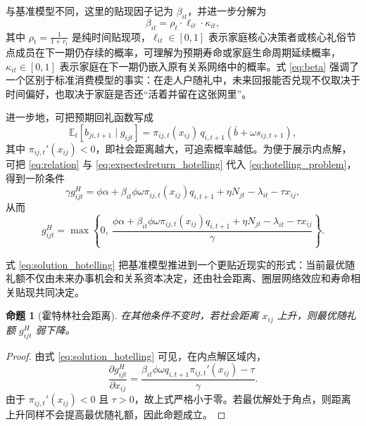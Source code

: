 \documentclass[12pt,a4paper]{ctexart}
\newtheorem{proposition}{命题}
\newcommand{\E}{\mathbb{E}}
\begin{document}
与基准模型不同，这里的贴现因子记为 $\beta_{it}$，并进一步分解为
\begin{equation}
\beta_{it}
=
\rho_t \cdot \ell_{it} \cdot \kappa_{it},
\label{eq:beta}
\end{equation}
其中 $\rho_t=\frac{1}{1+r_t}$ 是纯时间贴现项，$\ell_{it}\in[0,1]$ 表示家庭核心决策者或核心礼俗节点成员在下一期仍存续的概率，可理解为预期寿命或家庭生命周期延续概率，$\kappa_{it}\in[0,1]$ 表示家庭在下一期仍嵌入原有关系网络中的概率。式 \eqref{eq:beta} 强调了一个区别于标准消费模型的事实：在走人户随礼中，未来回报能否兑现不仅取决于时间偏好，也取决于家庭是否还“活着并留在这张网里”。

进一步地，可把预期回礼函数写成
\begin{equation}
\E_t[b_{ji,t+1}\mid g_{ijt}]
=
\pi_{ij,t}(x_{ij})\, q_{i,t+1}\left(\bar{b}+\omega s_{ij,t+1}\right),
\label{eq:expectedreturn_hotelling}
\end{equation}
其中 $\pi_{ij,t}'(x_{ij})<0$，即社会距离越大，可追索概率越低。为便于展示内点解，可把 \eqref{eq:relation} 与 \eqref{eq:expectedreturn_hotelling} 代入 \eqref{eq:hotelling_problem}，得到一阶条件
\begin{equation}
\gamma g_{ijt}^{H}
=
\phi\alpha
+\beta_{it}\phi\omega \pi_{ij,t}(x_{ij}) q_{i,t+1}
+\eta N_{jt}
-\lambda_{it}
-\tau x_{ij},
\label{eq:foc_hotelling}
\end{equation}
从而
\begin{equation}
g_{ijt}^{H}
=
\max\left\{
0,\
\frac{\phi\alpha+\beta_{it}\phi\omega \pi_{ij,t}(x_{ij}) q_{i,t+1}+\eta N_{jt}-\lambda_{it}-\tau x_{ij}}{\gamma}
\right\}.
\label{eq:solution_hotelling}
\end{equation}

式 \eqref{eq:solution_hotelling} 把基准模型推进到一个更贴近现实的形式：当前最优随礼额不仅由未来办事机会和关系资本决定，还由社会距离、圈层网络效应和寿命相关贴现共同决定。

\begin{proposition}[霍特林社会距离]
在其他条件不变时，若社会距离 $x_{ij}$ 上升，则最优随礼额 $g_{ijt}^{H}$ 弱下降。
\end{proposition}

\begin{proof}
由式 \eqref{eq:solution_hotelling} 可见，在内点解区域内，
\[
\frac{\partial g_{ijt}^{H}}{\partial x_{ij}}
=
\frac{\beta_{it}\phi\omega q_{i,t+1}\pi_{ij,t}'(x_{ij})-\tau}{\gamma}.
\]
由于 $\pi_{ij,t}'(x_{ij})<0$ 且 $\tau>0$，故上式严格小于零。若最优解处于角点，则距离上升同样不会提高最优随礼额，因此命题成立。
\end{proof}
\end{document}
